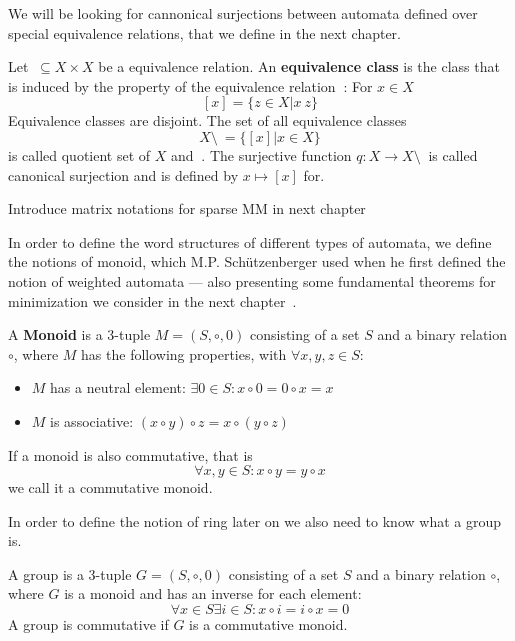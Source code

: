             We will be looking for cannonical surjections between automata defined over special equivalence relations, that we define in the next chapter.
            \begin{definition}
            Let $~ \subseteq X \times X$ be a equivalence relation. An \textbf{equivalence class} is the class that is induced by the property of the equivalence relation $~$: For $x \in X$
            \[ [x] = \{ z \in X | x ~ z\} \]
            Equivalence classes are disjoint. The set of all equivalence classes 
            \[ X \setminus ~ = \{ [x] | x \in X \} \]
            is called quotient set of $X$ and $~$. The surjective function $q: X \rightarrow X \setminus ~$ is called canonical surjection and is defined by $x \mapsto [x]$ for.
            \end{definition}
            
            Introduce matrix notations for sparse MM in next chapter
                        
            In order to define the word structures of different types of automata, we define the notions of monoid, which M.P. Schützenberger used when he first defined the notion of weighted automata --- also presenting some fundamental theorems for minimization we consider in the next chapter~\autocite{schutz}.            
            \begin{definition}[Monoid]
            A \textbf{Monoid} is a 3-tuple $M = (S, \circ, 0)$ consisting of a set $S$ and a binary relation $\circ$, where $M$ has the following properties, with $\forall x, y, z \in S$:
            \begin{itemize}
            \item $M$ has a neutral element: $\exists 0 \in S: x \circ 0 = 0 \circ x = x $
             \item $M$ is associative: $(x \circ y) \circ z = x \circ (y \circ z)$ 
            \end{itemize}
            If a monoid is also commutative, that is 
            \[ \forall x,y \in S: x \circ y = y \circ x \]
            we call it a commutative monoid.
            \end{definition}
            
            
            In order to define the notion of ring later on we also need to know what a group is.
            \begin{definition}[Group]
            A group is a 3-tuple $G = (S, \circ, 0)$ consisting of a set $S$ and a binary relation $\circ$, where $G$ is a monoid and has an inverse for each element:
            \[ \forall x \in S \exists i \in S: x \circ i = i \circ x = 0 \]
            A group is commutative if $G$ is a commutative monoid.
            \end{definition}
            
